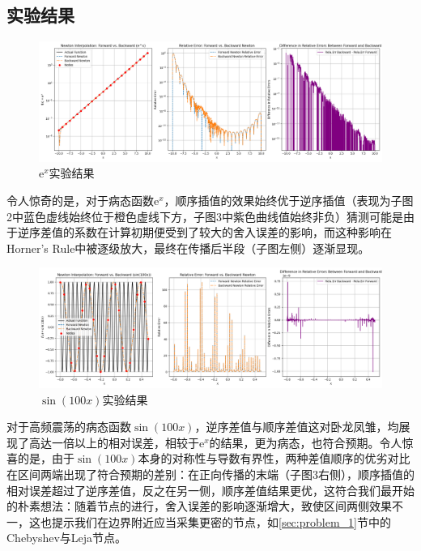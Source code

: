 \subsection{实验结果}
\begin{figure}[H]
    \centering
    \includegraphics[width=1.0\textwidth]{Problem_3/figs/exp.png}
    \caption{\(\mathrm{e}^x\)实验结果}
\end{figure}
令人惊奇的是，对于病态函数\(\mathrm{e}^x\)，顺序插值的效果始终优于逆序插值（表现为子图2中蓝色虚线始终位于橙色虚线下方，子图3中紫色曲线值始终非负）猜测可能是由于逆序差值的系数在计算初期便受到了较大的舍入误差的影响，而这种影响在Horner's Rule中被逐级放大，最终在传播后半段（子图左侧）逐渐显现。

\begin{figure}[H]
    \centering
    \includegraphics[width=1.0\textwidth]{Problem_3/figs/sin.png}
    \caption{\(\sin(100x)\)实验结果}
\end{figure}

对于高频震荡的病态函数\(\sin(100x)\)，逆序差值与顺序差值这对卧龙凤雏，均展现了高达一倍以上的相对误差，相较于\(\mathrm{e}^x\)的结果，更为病态，也符合预期。令人惊喜的是，由于\(\sin(100x)\)本身的对称性与导数有界性，两种差值顺序的优劣对比在区间两端出现了符合预期的差别：在正向传播的末端（子图3右侧），顺序插值的相对误差超过了逆序差值，反之在另一侧，顺序差值结果更优，这符合我们最开始的朴素想法：随着节点的进行，舍入误差的影响逐渐增大，致使区间两侧效果不一，这也提示我们在边界附近应当采集更密的节点，如\ref{sec:problem_1}节中的Chebyshev与Leja节点。